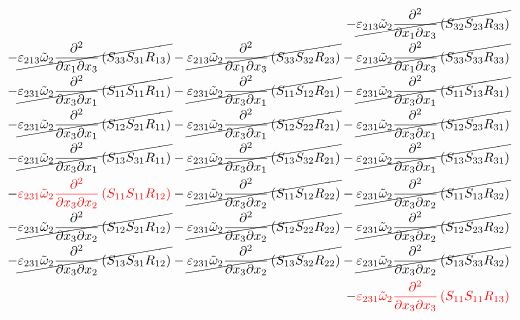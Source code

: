 \begin{equation}
\begin{split}
		-\cancel{\varepsilon_{213}\tilde{\omega}_{2}\pdv{}{x_{1}}{x_{3}}\left(S_{32}S_{23}R_{33}\right)}\\
		-\cancel{\varepsilon_{213}\tilde{\omega}_{2}\pdv{}{x_{1}}{x_{3}}\left(S_{33}S_{31}R_{13}\right)}
		-\cancel{\varepsilon_{213}\tilde{\omega}_{2}\pdv{}{x_{1}}{x_{3}}\left(S_{33}S_{32}R_{23}\right)}
		-\cancel{\varepsilon_{213}\tilde{\omega}_{2}\pdv{}{x_{1}}{x_{3}}\left(S_{33}S_{33}R_{33}\right)}\\
		-\cancel{\varepsilon_{231}\tilde{\omega}_{2}\pdv{}{x_{3}}{x_{1}}\left(S_{11}S_{11}R_{11}\right)}
		-\cancel{\varepsilon_{231}\tilde{\omega}_{2}\pdv{}{x_{3}}{x_{1}}\left(S_{11}S_{12}R_{21}\right)}
		-\cancel{\varepsilon_{231}\tilde{\omega}_{2}\pdv{}{x_{3}}{x_{1}}\left(S_{11}S_{13}R_{31}\right)}\\
		-\cancel{\varepsilon_{231}\tilde{\omega}_{2}\pdv{}{x_{3}}{x_{1}}\left(S_{12}S_{21}R_{11}\right)}
		-\cancel{\varepsilon_{231}\tilde{\omega}_{2}\pdv{}{x_{3}}{x_{1}}\left(S_{12}S_{22}R_{21}\right)}
		-\cancel{\varepsilon_{231}\tilde{\omega}_{2}\pdv{}{x_{3}}{x_{1}}\left(S_{12}S_{23}R_{31}\right)}\\
		-\cancel{\varepsilon_{231}\tilde{\omega}_{2}\pdv{}{x_{3}}{x_{1}}\left(S_{13}S_{31}R_{11}\right)}
		-\cancel{\varepsilon_{231}\tilde{\omega}_{2}\pdv{}{x_{3}}{x_{1}}\left(S_{13}S_{32}R_{21}\right)}
		-\cancel{\varepsilon_{231}\tilde{\omega}_{2}\pdv{}{x_{3}}{x_{1}}\left(S_{13}S_{33}R_{31}\right)}\\
		-{\color{red}\varepsilon_{231}\tilde{\omega}_{2}\pdv{}{x_{3}}{x_{2}}\left(S_{11}S_{11}R_{12}\right)}
		-\cancel{\varepsilon_{231}\tilde{\omega}_{2}\pdv{}{x_{3}}{x_{2}}\left(S_{11}S_{12}R_{22}\right)}
		-\cancel{\varepsilon_{231}\tilde{\omega}_{2}\pdv{}{x_{3}}{x_{2}}\left(S_{11}S_{13}R_{32}\right)}\\
		-\cancel{\varepsilon_{231}\tilde{\omega}_{2}\pdv{}{x_{3}}{x_{2}}\left(S_{12}S_{21}R_{12}\right)}
		-\cancel{\varepsilon_{231}\tilde{\omega}_{2}\pdv{}{x_{3}}{x_{2}}\left(S_{12}S_{22}R_{22}\right)}
		-\cancel{\varepsilon_{231}\tilde{\omega}_{2}\pdv{}{x_{3}}{x_{2}}\left(S_{12}S_{23}R_{32}\right)}\\
		-\cancel{\varepsilon_{231}\tilde{\omega}_{2}\pdv{}{x_{3}}{x_{2}}\left(S_{13}S_{31}R_{12}\right)}
		-\cancel{\varepsilon_{231}\tilde{\omega}_{2}\pdv{}{x_{3}}{x_{2}}\left(S_{13}S_{32}R_{22}\right)}
		-\cancel{\varepsilon_{231}\tilde{\omega}_{2}\pdv{}{x_{3}}{x_{2}}\left(S_{13}S_{33}R_{32}\right)}\\
		-{\color{red}\varepsilon_{231}\tilde{\omega}_{2}\pdv{}{x_{3}}{x_{3}}\left(S_{11}S_{11}R_{13}\right)}

\end{split}
\end{equation}
